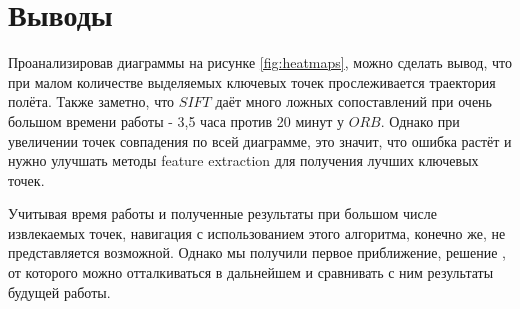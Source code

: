 \section{Выводы}

Проанализировав диаграммы на рисунке \ref{fig:heatmaps}, можно сделать вывод, что при малом количестве выделяемых ключевых точек прослеживается траектория полёта. Также заметно, что $SIFT$ даёт много ложных сопоставлений при очень большом времени работы - 3,5 часа против 20 минут у $ORB$. Однако при увеличении точек совпадения  по всей диаграмме, это значит, что ошибка растёт и нужно улучшать методы feature extraction для получения лучших ключевых точек.

Учитывая время работы и полученные результаты при большом числе извлекаемых точек, навигация с использованием этого алгоритма, конечно же, не представляется возможной. Однако мы получили первое приближение, решение , от которого можно отталкиваться в дальнейшем и сравнивать с ним результаты будущей работы.

\newpage
